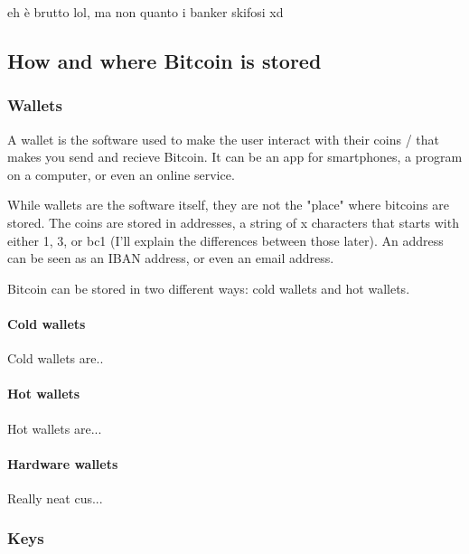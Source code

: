 \documentclass {article}
\begin{document}
eh è brutto lol, ma non quanto i banker skifosi xd



\subsection {How and where Bitcoin is stored}



\subsubsection {Wallets}



A wallet is the software used to make the user interact with their coins / that makes you send and recieve Bitcoin. It can be an app for smartphones, a program on a computer, or even an online service.

While wallets are the software itself, they are not the "place" where bitcoins are stored. The coins are stored in addresses, a string of x characters that starts with either 1, 3, or bc1 (I'll explain the differences between those later). An address can be seen as an IBAN address, or even an email address.

Bitcoin can be stored in two different ways: cold wallets and hot wallets.



\paragraph {Cold wallets}



Cold wallets are..



\paragraph {Hot wallets}



Hot wallets are...



\paragraph {Hardware wallets}



Really neat cus...



\subsubsection {Keys}
\end{document}
